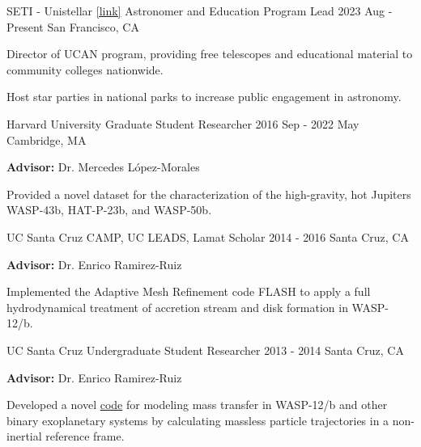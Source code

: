 

\begin{cventries}
  \cventry
    {
    SETI - Unistellar \href{https://www.seti.org/unistellar-college-astronomy-network-ucan}{[link]}
    }
    {Astronomer and Education Program Lead}
    {2023 Aug - Present}
    {San Francisco, CA}
    {
      \begin{cvitems}
        \item Director of UCAN program, providing free telescopes and educational material to community colleges nationwide.
        \item Host star parties in national parks to increase public engagement in astronomy.
      \end{cvitems}
    }
    
  \cventry
    {Harvard University} %
    {Graduate Student Researcher} %
    {2016 Sep - 2022 May} %
    {Cambridge, MA} %
    {
        \begin{cvitems} %
            \item[] \textbf{Advisor:} Dr. Mercedes López-Morales
            \item[] Provided a novel dataset for the characterization of the high-gravity, hot Jupiters WASP-43b, HAT-P-23b, and WASP-50b.
        \end{cvitems}
    }
    
  \cventry
    {UC Santa Cruz} %
    {CAMP, UC LEADS, Lamat Scholar} %
    {2014 - 2016} %
    {Santa Cruz, CA} %
    {
        \begin{cvitems} %
            \item[] \textbf{Advisor:} Dr. Enrico Ramirez-Ruiz
            \item[] Implemented the Adaptive Mesh Refinement code FLASH to apply a full hydrodynamical treatment of accretion stream and disk formation in WASP-12/b.
        \end{cvitems}
    }
    
  \cventry
    {UC Santa Cruz} %
    {Undergraduate Student Researcher} %
    {2013 - 2014} %
    {Santa Cruz, CA} %
    {
        \begin{cvitems} %
            \item[] \textbf{Advisor:} Dr. Enrico Ramirez-Ruiz
            \item[] Developed a novel \href{https://github.com/icweaver/particle_trajectory}{code} for modeling mass transfer in WASP-12/b and other binary exoplanetary systems by calculating massless particle trajectories in a non-inertial reference frame.
        \end{cvitems}
    }
    
\end{cventries}
